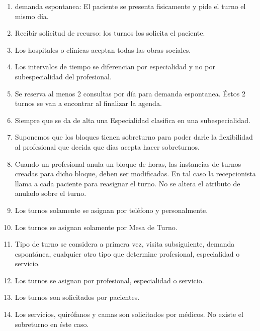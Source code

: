 \documentclass[a4paper,11pt]{article}
\begin{document}
\begin{enumerate}
  \item demanda espontanea: El paciente se presenta fisicamente y pide el turno el mismo día.

\item Recibir solicitud de recurso: los turnos los solicita el paciente.

\item Los hospitales o clínicas aceptan todas las obras sociales.

\item Los intervalos de tiempo se diferencian por especialidad y no por subespecialidad del profesional.

\item Se reserva al menos 2 consultas por día para demanda espontanea.
      Éstos 2 turnos se van a encontrar al finalizar la agenda.

\item Siempre que se da de alta una Especialidad clasifica en una subespecialidad.

\item Suponemos que los bloques tienen sobreturno para poder darle la flexibilidad al profesional 
      que decida que días acepta hacer sobreturnos.

\item Cuando un profesional anula un bloque de horas, las instancias de turnos creadas para dicho bloque, 
      deben ser modificadas. En tal caso la recepcionista llama a cada paciente para reasignar el turno.
      No se altera el atributo de anulado sobre el turno.

\item Los turnos solamente se asignan por teléfono y personalmente.

\item Los turnos se asignan solamente por Mesa de Turno.

\item Tipo de turno se considera a primera vez, visita subsiguiente, demanda espontánea, cualquier otro 
      tipo que determine profesional, especialidad o servicio.

\item Los turnos se asignan por profesional, especialidad o servicio.

\item Los turnos son solicitados por pacientes.

\item Los servicios, quirófanos y camas son solicitados por médicos. No existe el sobreturno en éste caso.


\end{enumerate}
\end{document}
